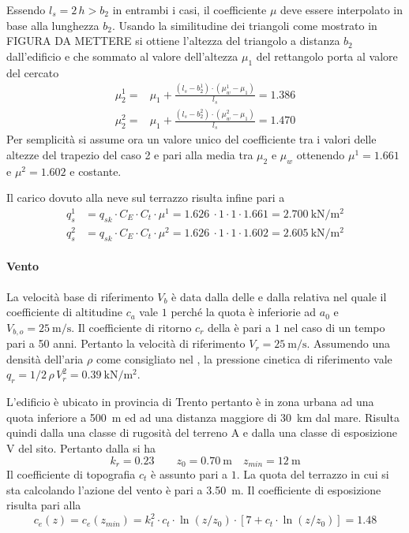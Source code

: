 Essendo $l_s=2\,h>b_2$ in entrambi i casi, il coefficiente $\mu$ deve essere interpolato in base alla lunghezza $b_2$. 
Usando la similitudine dei triangoli come mostrato in FIGURA DA METTERE si ottiene l'altezza del triangolo a distanza $b_2$ dall'edificio e che sommato al valore dell'altezza $\mu_1$ del rettangolo porta al valore del  cercato 
\begin{align*}
	\mu_2^{1}=&\mu_1 + \frac{(l_s - b_2^1)\cdot (\mu_w^1-\mu_1)}{l_s} = 1.386\\
	\mu_2^{2}=&\mu_1 + \frac{(l_s - b_2^2)\cdot (\mu_w^2-\mu_1)}{l_s} =	1.470
\end{align*}
Per semplicità si assume ora un valore unico del coefficiente tra i valori delle altezze del trapezio del caso 2 e pari alla media tra $\mu_2$ e $\mu_w$ ottenendo $\mu^1= 1.661$ e $\mu^2=1.602$ e costante.

Il carico dovuto alla neve sul terrazzo risulta infine pari a 
\begin{align}
q_s^1 &= q_{sk} \cdot C_E \cdot C_t \cdot \mu^1 = \SI{1.626}{} \cdot 1 \cdot 1 \cdot 1.661 = \SI{2.700}{\kilo\newton\per\square\meter}\\
q_s^2 &= q_{sk} \cdot C_E \cdot C_t \cdot \mu^2 = \SI{1.626}{} \cdot 1 \cdot 1 \cdot 1.602 = \SI{2.605}{\kilo\newton\per\square\meter}\label{eq:qneve}
\end{align}
\paragraph*{Vento} \label{cap:ventoTerrazzo} 
La velocità base di riferimento $V_b$ è data dalla  delle  e dalla relativa  nel quale il coefficiente di altitudine $c_a$ vale $1$ perché la quota è inferiorie ad $a_0$ e $V_{b,o}=\SI{25}{\meter\per\second}$. 
Il coefficiente di ritorno $c_r$ della  è pari a $1$ nel caso di un tempo pari a 50 anni. 
Pertanto la velocità di riferimento $V_r=\SI{25}{\meter\per\second}$.
Assumendo una densità dell'aria $\rho$ come consigliato nel , la pressione cinetica di riferimento vale $q_r =1/2\, \rho\, V_r^2 = \SI{0.39}{\kilo\newton\per\square\meter}$. 

L'edificio è ubicato in provincia di Trento pertanto è in zona urbana ad una quota inferiore a \SI{500}{\meter} ed ad una distanza maggiore di \SI{30}{\kilo\meter} dal mare. 
Risulta quindi dalla  una classe di rugosità del terreno A e dalla  una classe di esposizione V del sito.
Pertanto dalla  si ha
\[
	k_r=0.23 \qquad z_0=\SI{0.70}{\meter} \quad z_{min}=\SI{12}{\meter}
\]
Il coefficiente di topografia $c_t$ è assunto pari a $1$.
La quota del terrazzo in cui si sta calcolando l'azione del vento è pari a \SI{3.50}{\meter}.
Il coefficiente di esposizione risulta pari alla  
\[
	c_e(z)=c_e(z_{min})=k_t^2\cdot c_t \cdot \ln(z/z_0)\cdot[7+c_t\cdot\ln (z/z_0)] = 1.48
\]

